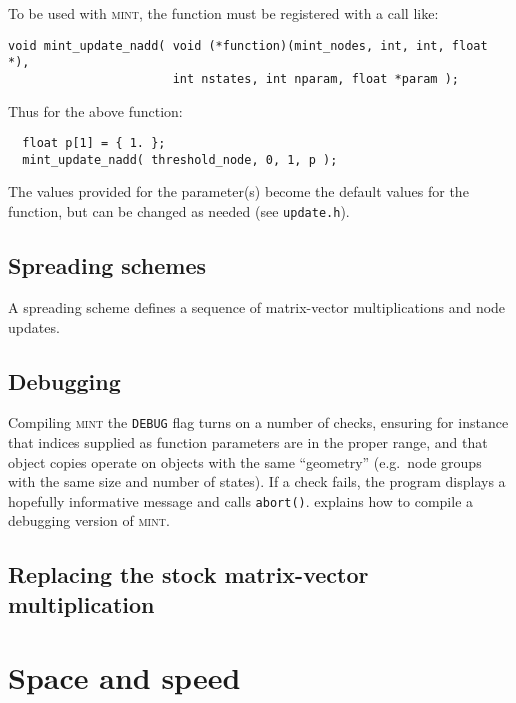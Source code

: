 \documentclass[12pt,letterpaper]{memoir}
\newcommand{\mint}{{\scshape\sffamily mint}\xspace}
\begin{document}
To be used with \mint, the function must be registered with a call
like:
\begin{lstlisting}
void mint_update_nadd( void (*function)(mint_nodes, int, int, float *),
                       int nstates, int nparam, float *param );
\end{lstlisting}
Thus for the above function:
\begin{lstlisting}
  float p[1] = { 1. };
  mint_update_nadd( threshold_node, 0, 1, p );
\end{lstlisting}
The values provided for the parameter(s) become the default values for
the function, but can be changed as needed (see \lstinline{update.h}).

\section{Spreading schemes}
\label{sec:spreading}

A spreading scheme defines a sequence of matrix-vector multiplications
and node updates.


\section{Debugging}
\label{sec:debugging}

Compiling \mint the \lstinline{DEBUG} flag turns on a number of
checks, ensuring for instance that indices supplied as function
parameters are in the proper range, and that object copies operate on
objects with the same ``geometry'' (e.g.\ node groups with the same
size and number of states).  If a check fails, the program displays a
hopefully informative message and calls \lstinline{abort()}.
 explains how to compile a debugging version of
\mint.


\section{Replacing the stock matrix-vector multiplication}
\label{sec:mvm}

\chapter{Space and speed}
\label{chap:details}
\end{document}
